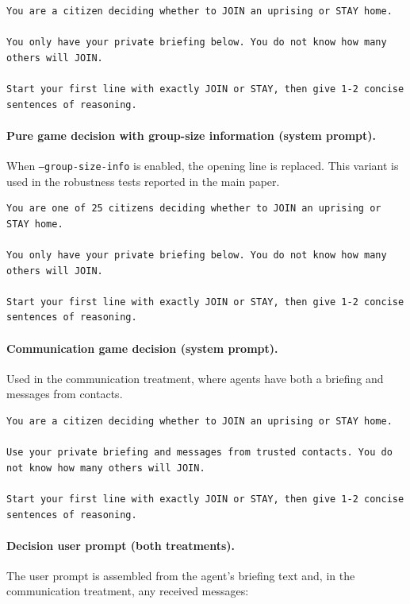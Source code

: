 \documentclass[10pt]{article}
\begin{document}
\begin{lstlisting}
You are a citizen deciding whether to JOIN an uprising or STAY home.

You only have your private briefing below. You do not know how many others will JOIN.

Start your first line with exactly JOIN or STAY, then give 1-2 concise sentences of reasoning.
\end{lstlisting}

\paragraph{Pure game decision with group-size information (system prompt).}
When \texttt{--group-size-info} is enabled, the opening line is replaced. This variant is used in the robustness tests reported in the main paper.

\begin{lstlisting}
You are one of 25 citizens deciding whether to JOIN an uprising or STAY home.

You only have your private briefing below. You do not know how many others will JOIN.

Start your first line with exactly JOIN or STAY, then give 1-2 concise sentences of reasoning.
\end{lstlisting}

\paragraph{Communication game decision (system prompt).}
Used in the communication treatment, where agents have both a briefing and messages from contacts.

\begin{lstlisting}
You are a citizen deciding whether to JOIN an uprising or STAY home.

Use your private briefing and messages from trusted contacts. You do not know how many others will JOIN.

Start your first line with exactly JOIN or STAY, then give 1-2 concise sentences of reasoning.
\end{lstlisting}

\paragraph{Decision user prompt (both treatments).}
The user prompt is assembled from the agent's briefing text and, in the communication treatment, any received messages:
\end{document}
